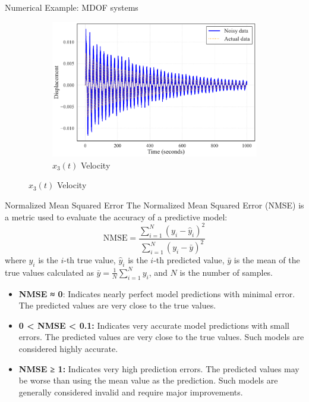 \documentclass{beamer}
\begin{document}
\begin{frame}{Numerical Example: MDOF systems}
\begin{figure}[!ht]
\begin{subfigure}{0.31\textwidth}
      \includegraphics[width=\textwidth]{noised_displacement_vs_actual_mass_3.pdf}
      \caption{$x_3(t)$ Velocity}
  \end{subfigure}
    \label{fig:13}%
  \end{figure}
\end{frame}


\begin{frame}{Normalized Mean Squared Error }
  The Normalized Mean Squared Error (NMSE) is a metric used to evaluate the accuracy of a predictive model:
  \[
  \text{NMSE} = \frac{\sum_{i=1}^{N} (y_i - \hat{y}_i)^2}{\sum_{i=1}^{N} (y_i - \bar{y})^2}
  \]
  where \( y_i \) is the \(i\)-th true value, \( \hat{y}_i \) is the \(i\)-th predicted value, \( \bar{y} \) is the mean of the true values calculated as \( \bar{y} = \frac{1}{N} \sum_{i=1}^{N} y_i \), and \( N \) is the number of samples.
  \begin{itemize}
    \item  \textbf{NMSE ≈ 0}: Indicates nearly perfect model predictions with minimal error. The predicted values are very close to the true values.
    \item \textbf{0 < NMSE < 0.1:} Indicates very accurate model predictions with small errors. The predicted values are very close to the true values. 
    Such models are considered highly accurate.
    \item \textbf{NMSE ≥ 1:} Indicates very high prediction errors. The predicted values may be worse than using the mean value as the prediction. Such models are generally considered invalid and require major improvements.
  \end{itemize}
\end{frame}
\end{document}
